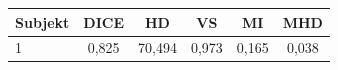 \begin{tabular}{l c c c c c}
 \hline
Subjekt & DICE & HD & VS & MI & MHD \\ \hline
1 & 0,825 & 70,494 & 0,973 & 0,165 & 0,038 \\
\hline 
 \end{tabular}
